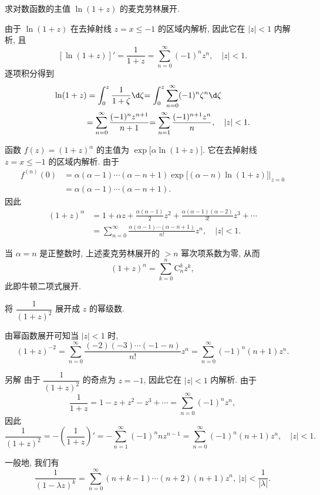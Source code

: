 \begin{example}
求对数函数的主值 $\ln(1+z)$ 的麦克劳林展开.
\end{example}
\begin{solution}
由于 $\ln(1+z)$ 在去掉射线 $z=x\le-1$ 的区域内解析,
{因此它在 $|z|<1$ 内解析,
}{且
	\[[\ln(1+z)]'=\frac1{1+z}=\sum_{n=0}^\infty(-1)^nz^n,\quad|z|<1.\]
}{逐项积分得到
\begin{align*}
\ln(1+z)&=\int_0^z\frac1{1+\zeta}\d\zeta
	{=\int_0^z\sum_{n=0}^\infty(-1)^n\zeta^n\d\zeta}\\
&{=\sum_{n=0}^\infty\frac{(-1)^nz^{n+1}}{n+1}}
	{=\sum_{n=1}^\infty\frac{(-1)^{n+1}z^n}{n},\quad|z|<1.}
\end{align*}}
\end{solution}

\begin{example}
	函数 $f(z)=(1+z)^\alpha$ 的主值为 $\exp\bigl[\alpha\ln(1+z)\bigr]$. 它在去掉射线 $z=x\le -1$ 的区域内解析. 由于
	\begin{align*}
		f^{(n)}(0)&=\alpha(\alpha-1)\cdots(\alpha-n+1)\exp\bigl[(\alpha-n)\ln(1+z)\bigr]\Big|_{z=0}\\
		&=\alpha(\alpha-1)\cdots(\alpha-n+1).
	\end{align*}
	因此
	\begin{align*}
		(1+z)^\alpha&=1+\alpha z+\frac{\alpha(\alpha-1)}2z^2+\frac{\alpha(\alpha-1)(\alpha-2)}{3!}z^3+\cdots\\
		&=\sum_{n=0}^\infty\frac{\alpha(\alpha-1)\cdots(\alpha-n+1)}{n!}z^n,\quad |z|<1.
	\end{align*}
\end{example}

当 $\alpha=n$ 是正整数时, 上述麦克劳林展开的 $>n$ 幂次项系数为零, 
从而
	\[(1+z)^n=\sum_{k=0}^n \mathrm{C}_n^k z^k,\]
此即牛顿二项式展开.

\begin{example}
	将 $\dfrac1{(1+z)^2}$ 展开成 $z$ 的幂级数.
\end{example}

\begin{solution}
	由幂函数展开可知当 $|z|<1$ 时,
	\[(1+z)^{-2}=\sum_{n=0}^\infty \frac{(-2)(-3)\cdots(-1-n)}{n!}z^n
	{=\sum_{n=0}^\infty (-1)^n(n+1)z^n.}\]
\end{solution}

\begin{solution}{另解}
	由于 $\dfrac1{(1+z)^2}$ 的奇点为 $z=-1$, 因此它在 $|z|<1$ 内解析.
	{由于
		\[\frac1{1+z}=1-z+z^2-z^3+\cdots=\sum_{n=0}^\infty (-1)^nz^n,\]因此
		\[
		\frac1{(1+z)^2}=-\left(\frac1{1+z}\right)'
		{=-\sum_{n=1}^\infty(-1)^n nz^{n-1}}
		{=\sum_{n=0}^\infty(-1)^n (n+1)z^n,\quad |z|<1.}
		\]
	}
\end{solution}
一般地, 我们有
\[\frac1{(1-\lambda z)^k}=\sum_{n=0}^\infty(n+k-1)\cdots(n+2)(n+1)z^n,\ |z|<\frac1{|\lambda|}.\]

